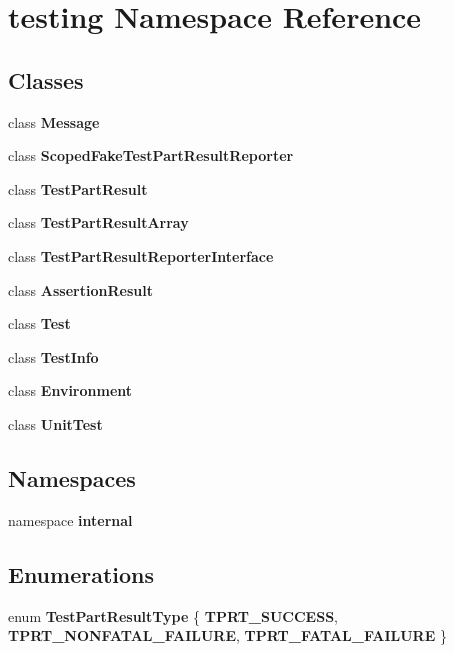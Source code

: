 \section{testing Namespace Reference}
\label{namespacetesting}


\subsection*{Classes}
\begin{CompactItemize}
\item 
class {\bf Message}
\item 
class {\bf ScopedFakeTestPartResultReporter}
\item 
class {\bf TestPartResult}
\item 
class {\bf TestPartResultArray}
\item 
class {\bf TestPartResultReporterInterface}
\item 
class {\bf AssertionResult}
\item 
class {\bf Test}
\item 
class {\bf TestInfo}
\item 
class {\bf Environment}
\item 
class {\bf UnitTest}
\end{CompactItemize}
\subsection*{Namespaces}
\begin{CompactItemize}
\item 
namespace {\bf internal}
\end{CompactItemize}
\subsection*{Enumerations}
\begin{CompactItemize}
\item 
enum {\bf TestPartResultType} \{ {\bf TPRT\_\-SUCCESS}, 
{\bf TPRT\_\-NONFATAL\_\-FAILURE}, 
{\bf TPRT\_\-FATAL\_\-FAILURE}
 \}
\end{CompactItemize}
